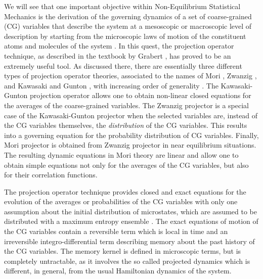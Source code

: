 \documentclass[b5paper,openright,11pt]{book}
\begin{document}
We will see that one important  objective within Non-Equilibrium  Statistical Mechanics
is the derivation of the governing dynamics of a set of coarse-grained
(CG) variables that describe the system at a mesoscopic or macroscopic
level of description  by starting from the microscopic  laws of motion
of the constituent atoms and  molecules of the system \cite{Kubo1991}.
In this quest, the projection  operator technique, as described in the
textbook by Grabert \cite{Grabert1982}, has  proved to be an extremely
useful  tool.   As  discussed   there,  there  are  essentially  three
different  types of  projection operator  theories, associated  to the
names  of   Mori  \cite{Mori1965},  Zwanzig   \cite{Zwanzig1961},  and
Kawasaki  and Gunton  \cite{Kawasaki1973},  with  increasing order  of
generality \cite{Grabert1982}. The Kawasaki-Gunton projection operator
allows one to  obtain non-linear closed equations for  the averages of
the coarse-grained variables. The Zwanzig  projector is a special case
of  the Kawasaki-Gunton  projector  when the  selected variables  are,
instead of  the CG variables themselves,  the \textit{distribution} of
the  CG variables.  This results  into  a governing  equation for  the
probability distribution of CG  variables.  Finally, Mori projector is
obtained    from    Zwanzig     projector    in    near    equilibrium
situations\cite{Grabert1982,Kauzlaric2011a}.   The  resulting  dynamic
equations in  Mori theory are  linear and  allow one to  obtain simple
equations not only for the averages  of the CG variables, but also for
their correlation functions.

The projection operator technique  provides closed and exact equations
for the  evolution of the averages or probabilities  of the CG variables  with only one
assumption about  the initial  distribution of microstates,  which are
assumed   to  be   distributed   with  a   maximum  entropy   ensemble
\cite{Grabert1982}. The exact equations of  motion of the CG variables
contain a reversible  term which is local in time  and an irreversible
integro-differential term describing memory  about the past history of
the CG variables.  The memory  kernel is defined in microscopic terms,
but is completely untractable, as  it involves the so called projected
dynamics which  is different, in  general, from the  usual Hamiltonian
dynamics of the system.
\end{document}
